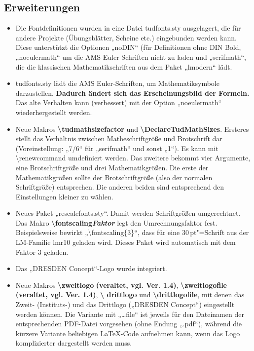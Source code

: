 \documentclass[a0paper,noDIN,MathematikA0]{tudmathposter}
\begin{document}
\begin{multicols}
\subsection{Erweiterungen}
\begin{itemize}
\item Die Fontdefinitionen wurden in eine Datei tudfonts.sty
  ausgelagert, die für andere Projekte (Übungsblätter, Scheine etc.)
  eingebunden werden kann. Diese unterstützt die Optionen „noDIN“ (für 
  Definitionen ohne DIN Bold, „noeulermath“ um die AMS Euler-Schriften
  nicht zu laden und „serifmath“, die die klassischen
  Mathematikschriften aus dem Paket „lmodern“ lädt.
\item tudfonts.sty lädt die AMS Euler-Schriften,
  um Mathematiksymbole darzustellen. \textbf{Dadurch ändert sich das
    Erscheinungsbild der Formeln.} Das alte Verhalten kann
  (verbessert) mit der Option „noeulermath“ wiederhergestellt werden.
\item Neue Makros \textbf{\textbackslash tudmathsizefactor} und
  \textbf{\textbackslash DeclareTudMathSizes}. Ersteres stellt das
  Verhältnis zwischen Matheschriftgröße und Brotschrift dar
  (Voreinstellung: „7/6“ für „serifmath“ und sonst „1“). Es kann mit
  \textbackslash renewcommand umdefiniert werden. Das zweitere bekommt
  vier Argumente, eine Brotschriftgröße und drei Mathematikgrößen. Die
  erste der Mathematikgrößen sollte der Brotschriftgröße (also der
  normalen Schriftgröße) entsprechen. Die anderen beiden sind
  entsprechend den Einstellungen kleiner zu wählen.
\item Neues Paket „rescalefonts.sty“. Damit werden Schriftgrößen
  umgerechtnet. Das Makro \textbf{\textbackslash fontscaling{\textit{Faktor}}}
  legt den Umrechnungsfaktor fest. Beispielsweise bewirkt
  „\textbackslash fontscaling\{3\}“, dass für eine $30$\,pt"=Schrift
  aus der LM-Familie lmr10 geladen wird. Dieses Paket wird automatisch
  mit dem Faktor 3 geladen.
\item Das „DRESDEN Concept“-Logo wurde integriert.
\item Neue Makros \textbf{\textbackslash zweitlogo} \textbf{(veraltet,
    vgl. Ver. 1.4)},
  \textbf{\textbackslash zweitlogofile} \textbf{(veraltet,
    vgl. Ver. 1.4)}, \textbf{\textbackslash
    drittlogo} und \textbf{\textbackslash drittlogofile}, mit denen
  das Zweit- (Instituts-) und das Drittlogo („DRESDEN Concept“)
  eingestellt werden können. Die Variante mit „\dots file“ ist jeweils
  für den Dateinamen der entsprechenden PDF-Datei vorgesehen (ohne
  Endung „.pdf“), während die kürzere Variante beliebigen LaTeX-Code
  aufnehmen kann, wenn das Logo komplizierter dargestellt werden muss.
\end{itemize}
\end{multicols}
\end{document}
